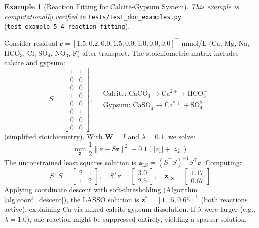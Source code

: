 \documentclass[12pt,a4paper]{article}
\theoremstyle{plain}
\theoremstyle{definition}
\newtheorem{example}[theorem]{Example}
\theoremstyle{remark}
\begin{document}
\begin{example}[Reaction Fitting for Calcite-Gypsum System]\label{ex:reaction_fit}
	\textit{This example is computationally verified in} \texttt{tests/test\_doc\_examples.py} (\texttt{test\_example\_5\_4\_reaction\_fitting}).

	Consider residual $\mathbf{r} = [1.5, 0.2, 0.0, 1.5, 0.0, 1.0, 0.0, 0.0]^\top$ mmol/L (Ca, Mg, Na, HCO$_3$, Cl, SO$_4$, NO$_3$, F) after transport. The stoichiometric matrix includes calcite and gypsum:
	\begin{equation}
		S = \begin{bmatrix}
			1 & 1 \\
			0 & 0 \\
			0 & 0 \\
			1 & 0 \\
			0 & 0 \\
			0 & 1 \\
			0 & 0 \\
			0 & 0
		\end{bmatrix}, \quad
		\begin{matrix}
			\text{Calcite: CaCO}_3 \to \text{Ca}^{2+} + \text{HCO}_3^- \\
			\text{Gypsum: CaSO}_4 \to \text{Ca}^{2+} + \text{SO}_4^{2-}
		\end{matrix}
	\end{equation}
	(simplified stoichiometry). With $\mathbf{W} = I$ and $\lambda = 0.1$, we solve:
	\begin{equation}
		\min_{\mathbf{z}} \frac{1}{2} \|\mathbf{r} - S\mathbf{z}\|^2 + 0.1 (|z_1| + |z_2|)
	\end{equation}
	The unconstrained least squares solution is $\mathbf{z}_{\text{LS}} = (S^\top S)^{-1} S^\top \mathbf{r}$. Computing:
	\begin{equation}
		S^\top S = \begin{bmatrix} 2 & 1 \\ 1 & 2 \end{bmatrix}, \quad S^\top \mathbf{r} = \begin{bmatrix} 3.0 \\ 2.5 \end{bmatrix}, \quad \mathbf{z}_{\text{LS}} = \begin{bmatrix} 1.17 \\ 0.67 \end{bmatrix}
	\end{equation}
	Applying coordinate descent with soft-thresholding (Algorithm \ref{alg:coord_descent}), the LASSO solution is $\mathbf{z}^* = [1.15, 0.65]^\top$ (both reactions active), explaining Ca via mixed calcite-gypsum dissolution. If $\lambda$ were larger (e.g., $\lambda = 1.0$), one reaction might be suppressed entirely, yielding a sparser solution.
\end{example}
\end{document}
